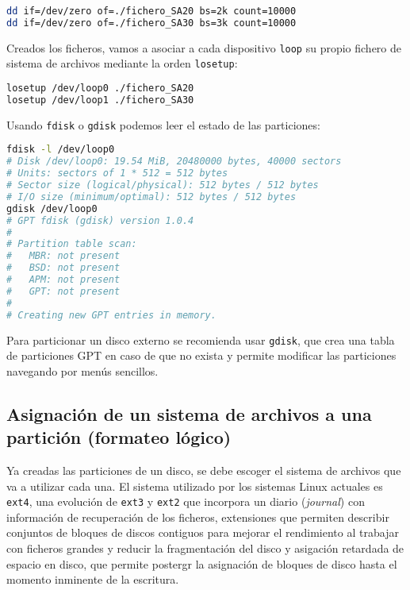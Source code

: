\begin{lstlisting}[language=Bash]
dd if=/dev/zero of=./fichero_SA20 bs=2k count=10000
dd if=/dev/zero of=./fichero_SA30 bs=3k count=10000
\end{lstlisting}

Creados los ficheros, vamos a asociar a cada dispositivo \texttt{loop} su propio fichero de sistema de archivos mediante la orden \texttt{losetup}:

\begin{lstlisting}[language=Bash]
losetup /dev/loop0 ./fichero_SA20
losetup /dev/loop1 ./fichero_SA30
\end{lstlisting}

Usando \texttt{fdisk} o \texttt{gdisk} podemos leer el estado de las particiones:

\begin{lstlisting}[language=Bash]
fdisk -l /dev/loop0
# Disk /dev/loop0: 19.54 MiB, 20480000 bytes, 40000 sectors
# Units: sectors of 1 * 512 = 512 bytes
# Sector size (logical/physical): 512 bytes / 512 bytes
# I/O size (minimum/optimal): 512 bytes / 512 bytes
gdisk /dev/loop0
# GPT fdisk (gdisk) version 1.0.4
#
# Partition table scan:
#   MBR: not present
#   BSD: not present
#   APM: not present
#   GPT: not present
#
# Creating new GPT entries in memory.
\end{lstlisting}

Para particionar un disco externo se recomienda usar \texttt{gdisk}, que crea una tabla de particiones GPT en caso de que no exista y permite modificar las particiones navegando por menús sencillos.

\subsection{Asignación de un sistema de archivos a una partición (formateo lógico)}

Ya creadas las particiones de un disco, se debe escoger el sistema de archivos que va a utilizar cada una.
El sistema utilizado por los sistemas Linux actuales es \texttt{ext4}, una evolución de \texttt{ext3} y \texttt{ext2} que incorpora un diario (\emph{journal}) con información de recuperación de los ficheros, extensiones que permiten describir conjuntos de bloques de discos contiguos para mejorar el rendimiento al trabajar con ficheros grandes y reducir la fragmentación del disco y asigación retardada de espacio en disco, que permite postergr la asignación de bloques de disco hasta el momento inminente de la escritura.

